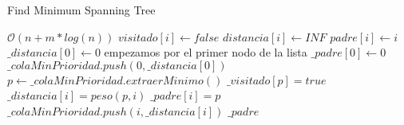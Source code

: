 \begin{algorithm}[H]
\caption{Find Minimum Spanning Tree}
\begin{algorithmic}[1]
 \Comment $\mathcal{O}(n + m*log(n))$
		\State $visitado[i] \gets false$
		\State $distancia[i] \gets INF$
		\State $padre[i] \gets i$
	\EndFor
	\Statex
	\State $\_distancia[0] \gets 0$ \Comment empezamos por el primer nodo de la lista
	\State $\_padre[0] \gets 0$
	\State $\_colaMinPrioridad.push(0, \_distancia[0])$
	\Statex
		\State $p \gets \_colaMinPrioridad.extraerMinimo()$
			\State $\_visitado[p] = true$
						\State $\_distancia[i] = peso(p, i)$
						\State $\_padre[i] = p$
						\State $\_colaMinPrioridad.push(i, \_distancia[i])$
					\EndIf
				\EndIf
			\EndFor
		\EndIf
	\EndWhile
	\Statex
	\State \Return $\_padre$
\EndFunction
\end{algorithmic}
\end{algorithm}